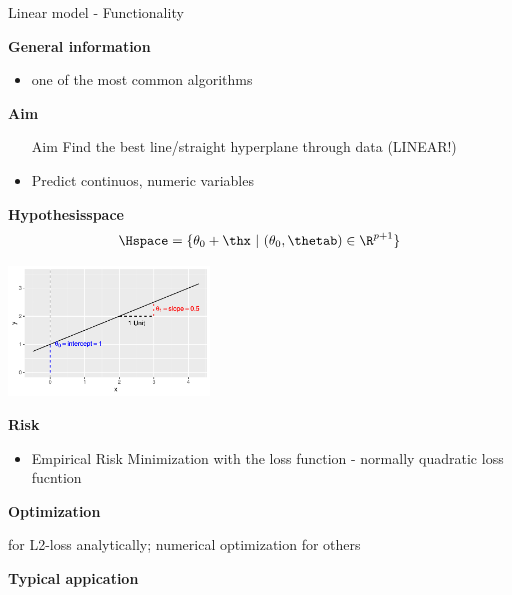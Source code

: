 \documentclass[11pt,compress,t,notes=noshow, xcolor=table]{beamer}
\begin{document}
\begin{vbframe}{Linear model - Functionality}

\textbf{General information}
\begin{itemize}
\item one of the most common algorithms
\end{itemize}

\textbf{Aim}
\begin{itemize}
\item [Aim] Find the best line/straight hyperplane through data (LINEAR!)
\item Predict continuos, numeric variables
\end{itemize}

 
\textbf{Hypothesisspace}
$$\Hspace = \{ \theta_0 + \thx\ |\ (\theta_0, \thetab) \in \R^{p+1} \}$$

\centering \includegraphics[width=0.4\textwidth]{figure/reg_lm_plot.pdf} 

\framebreak

\textbf{Risk}
\begin{itemize}
\item Empirical Risk Minimization with the loss function - normally quadratic loss fucntion 
\end{itemize}

\textbf{Optimization}

for L2-loss analytically; numerical optimization for others 


\lz

\textbf{Typical appication}




\end{vbframe}
\end{document}
